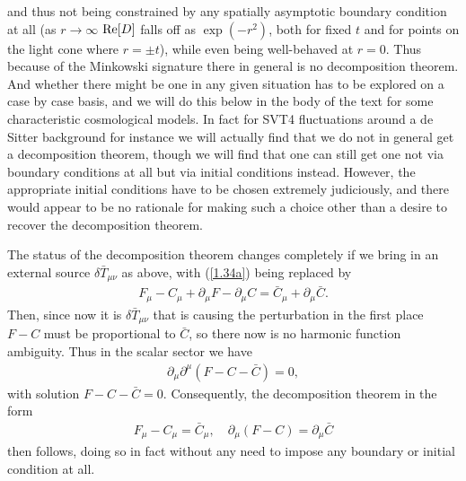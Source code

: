 \documentclass[aps,onecolumn,10pt]{revtex4}
\numberwithin{equation}{section}
\numberwithin{equation}{section}
\begin{document}
%
and thus not being constrained by any spatially asymptotic boundary condition at all (as $r\rightarrow \infty$
${\rm Re}[D]$ falls off as $\exp(-r^2)$, both for fixed $t$ and for points on the light cone where $r=\pm t$), while even being well-behaved at $r=0$. Thus because of the Minkowski signature there in general is no decomposition theorem. And whether there might be one in any given situation has to be explored on a case by case basis, and we will do this below in the body of the text for some characteristic cosmological models. In fact for SVT4 fluctuations around a de Sitter background for instance we will actually find that we do not in general get a decomposition theorem, though we will find that one can still get one not via boundary conditions at all but via initial conditions instead. However, the appropriate initial conditions have to be chosen extremely judiciously, and there would appear to be no rationale for making such a choice other than a desire to recover the decomposition theorem.

The status of the decomposition theorem changes completely  if we bring in an external source $\delta \bar{T}_{\mu\nu}$ as above, with (\ref{1.34a}) being replaced by 
%
\begin{eqnarray}
F_{\mu}-C_{\mu}+\partial_{\mu}F-\partial_{\mu}C=\bar{C}_{\mu}+\partial_{\mu}\bar{C}.
\label{1.39a}
\end{eqnarray}
%
Then, since now it is $\delta \bar{T}_{\mu\nu}$ that is causing the perturbation in the first place $F-C$ must be proportional to $\bar{C}$, so there now is no harmonic function ambiguity. Thus in the scalar sector we have
%
\begin{eqnarray}
\partial_{\mu}\partial^{\mu}(F-C-\bar{C})=0, 
\label{1.40a}
\end{eqnarray}
%
with solution $F-C-\bar{C}=0$. Consequently,  the decomposition theorem in the form 
%
\begin{eqnarray}
F_{\mu}-C_{\mu}= \bar{C}_{\mu},\quad \partial_{\mu}(F-C)=\partial_{\mu}\bar{C}
\label{1.41a}
\end{eqnarray}
% 
then follows, doing so in fact without any need to impose any boundary or initial condition at all.
\end{document}
